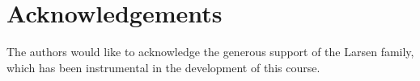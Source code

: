 \documentclass[sigconf]{acmart}
\begin{document}

\maketitle








\section*{Acknowledgements}
The authors would like to acknowledge the generous support of the Larsen family, which has been instrumental in the development of this course.



\end{document}
